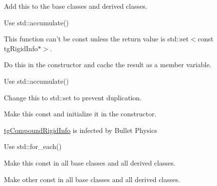 \begin{DoxyRefList}
Add this to the base classes and derived classes.  
\item[\label{todo__todo000067}%
\hypertarget{todo__todo000067}{}%
Member \hyperlink{classtg_compound_rigid_info_ae2cd4e778a173251232f257467a84a17}{tg\-Compound\-Rigid\-Info\-:\-:get\-Contained\-Nodes} () const ]Use std\-::accumulate()  
\item[\label{todo__todo000075}%
\hypertarget{todo__todo000075}{}%
Member \hyperlink{classtg_compound_rigid_info_a253b7389913caff94baa2a34150d1171}{tg\-Compound\-Rigid\-Info\-:\-:get\-Leaf\-Rigids} ()]This function can't be const unless the return value is std\-::set$<$const tg\-Rigid\-Info$\ast$$>$.  
\item[\label{todo__todo000071}%
\hypertarget{todo__todo000071}{}%
Member \hyperlink{classtg_compound_rigid_info_a2989775971a4723c170c6d8c982f28f8}{tg\-Compound\-Rigid\-Info\-:\-:get\-Mass} () const ]Do this in the constructor and cache the result as a member variable. 

Use std\-::accumulate()  
\item[\label{todo__todo000077}%
\hypertarget{todo__todo000077}{}%
Member \hyperlink{classtg_compound_rigid_info_a4131882aec347aa599442b578ac6d4e9}{tg\-Compound\-Rigid\-Info\-:\-:m\-\_\-rigids} ]Change this to std\-::set to prevent duplication. 

Make this const and initialize it in the constructor.  
\item[\label{todo__todo000072}%
\hypertarget{todo__todo000072}{}%
Member \hyperlink{classtg_compound_rigid_info_a9eab038d880498b14bf0229eca28b933}{tg\-Compound\-Rigid\-Info\-:\-:set\-Rigid\-Body} (bt\-Rigid\-Body $\ast$const rigid\-Body)]\hyperlink{classtg_compound_rigid_info}{tg\-Compound\-Rigid\-Info} is infected by Bullet Physics 

Use std\-::for\-\_\-each()  
\item[\label{todo__todo000076}%
\hypertarget{todo__todo000076}{}%
Member \hyperlink{classtg_compound_rigid_info_a372bf800b5f126b5347acb109b3bba53}{tg\-Compound\-Rigid\-Info\-:\-:shares\-Nodes\-With} (const \hyperlink{classtg_rigid_info}{tg\-Rigid\-Info} \&other) const ]Make this const in all base classes and all derived classes. 

Make other const in all base classes and all derived classes. 


\end{DoxyRefList}
